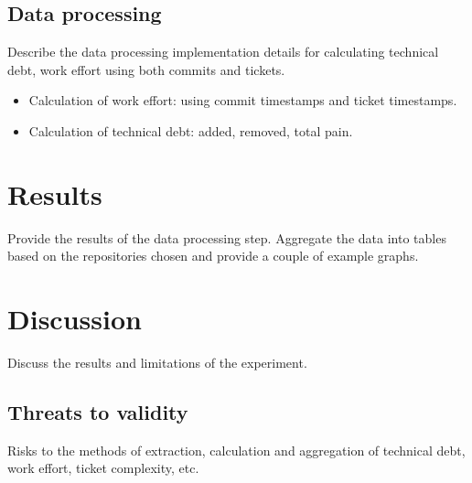 \documentclass{article}
\begin{document}
\subsection{Data processing}
\label{data-processing}

Describe the data processing implementation details for calculating technical
debt, work effort using both commits and tickets.

\begin{itemize}
  \item Calculation of work effort: using commit timestamps and ticket timestamps.
  \item Calculation of technical debt: added, removed, total pain.
\end{itemize}

\section{Results}
\label{results}

Provide the results of the data processing step. Aggregate the data into tables
based on the repositories chosen and provide a couple of example graphs. 

\section{Discussion}
\label{discussion}

Discuss the results and limitations of the experiment.

\subsection{Threats to validity}
\label{validity}

Risks to the methods of extraction, calculation and aggregation of technical
debt, work effort, ticket complexity, etc.
\end{document}
